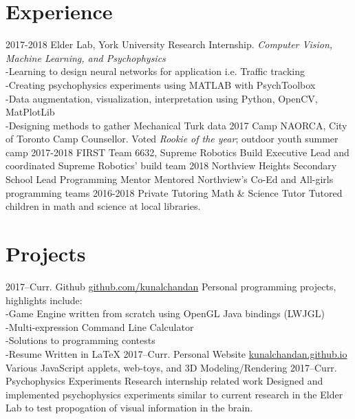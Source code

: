 \documentclass[]{chandan-cv}
\begin{document}
\section{Experience}

\begin{entrylist}
  \entry
    {2017-2018}
    {Elder Lab, York University}
    {Research Internship.}
    {\emph{Computer Vision, Machine Learning, and Psychophysics}
\\-Learning to design neural networks for application i.e. Traffic tracking
\\-Creating psychophysics experiments using MATLAB with PsychToolbox
\\-Data augmentation, visualization, interpretation using Python, OpenCV, MatPlotLib
\\-Designing methods to gather Mechanical Turk data}
  \entry
    {2017}
    {Camp NAORCA, City of Toronto}
    {Camp Counsellor.}
    {Voted \emph{Rookie of the year}; outdoor youth summer camp}
  \entry
    {2017-2018}
    {FIRST Team 6632, Supreme Robotics}
    {Build Executive}
    {Lead and coordinated Supreme Robotics' build team}
  \entry
    {2018}
    {Northview Heights Secondary School}
    {Lead Programming Mentor}
    {Mentored Northview's Co-Ed and All-girls programming teams}
  \entry
    {2016-2018}
    {Private Tutoring}
    {Math \& Science Tutor}
    {Tutored children in math and science at local libraries.}
\end{entrylist}

\section{Projects}

\begin{entrylist}
  \entry
    {2017–Curr.}
    {Github}
    {\href{https://github.com/kunalchandan}{github.com/kunalchandan}}
    {Personal programming projects, highlights include:
	\\-Game Engine written from scratch using OpenGL Java bindings (LWJGL)	
	\\-Multi-expression Command Line Calculator
	\\-Solutions to programming contests
	\\-Resume Written in LaTeX}
  \entry
    {2017–Curr.}
    {Personal Website}
    {\href{https://kunalchandan.github.io}{kunalchandan.github.io}}
    {Various JavaScript applets, web-toys, and 3D Modeling/Rendering}
  \entry
    {2017–Curr.}
    {Psychophysics Experiments}
    {Research internship related work}
    {Designed and implemented psychophysics experiments similar to current research in the Elder Lab to test propogation of visual information in the brain.}
\end{entrylist}
\end{document}
